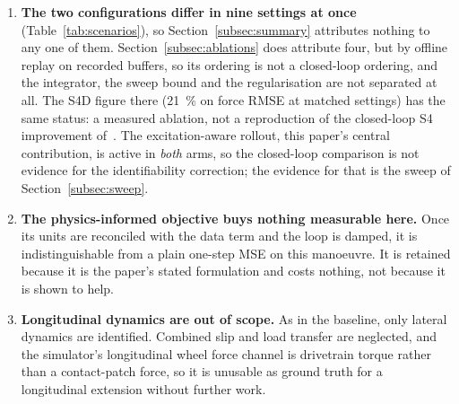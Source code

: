 \begin{enumerate}
undamped, and on the decaying surface it arrives with one cycle of lag on top
of it. Relatedly, the rear axle is not identified on this trajectory and the
front-axle $\mu$ is applied to both (Section~\ref{subsec:frictionfloor}); the
quasi-steady argument making $\mu_{f}=\mu_{r}$ holds on a homogeneous surface
and would not survive a split-$\mu$ one, which this sensor set cannot detect in
the first place.
\item \textbf{The two configurations differ in nine settings at once}
(Table~\ref{tab:scenarios}), so Section~\ref{subsec:summary} attributes nothing
to any one of them. Section~\ref{subsec:ablations} does attribute four, but by
offline replay on recorded buffers, so its ordering is not a closed-loop
ordering, and the integrator, the sweep bound and the regularisation are not
separated at all. The S4D figure there (\SI{21}{\percent} on force RMSE at
matched settings) has the same status: a measured ablation, not a reproduction
of the closed-loop S4 improvement of~\cite{visionsysid2026}. The
excitation-aware rollout, this paper's central contribution, is active in
\emph{both} arms, so the closed-loop comparison is not evidence for the
identifiability correction; the evidence for that is the sweep of
Section~\ref{subsec:sweep}.
\item \textbf{The physics-informed objective buys nothing measurable here.}
Once its units are reconciled with the data term and the loop is damped, it is
indistinguishable from a plain one-step MSE on this manoeuvre. It is retained
because it is the paper's stated formulation and costs nothing, not because it
is shown to help.
\item \textbf{Longitudinal dynamics are out of scope.} As in the baseline, only
lateral dynamics are identified. Combined slip and load transfer are neglected,
and the simulator's longitudinal wheel force channel is drivetrain torque rather
than a contact-patch force, so it is unusable as ground truth for a longitudinal
extension without further work.
\end{enumerate}
